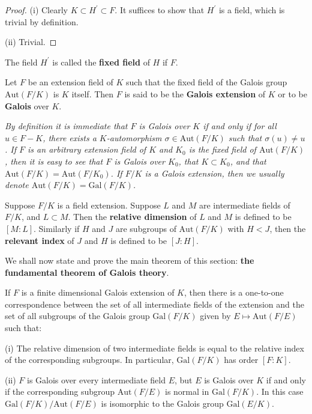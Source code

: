 \begin{proof}
(i) Clearly $K\subset H^\prime\subset F$. It suffices to show that $H^\prime$ is a field, which is trivial by definition.\par
(ii) Trivial.
\end{proof}
The field $H^\prime$ is called the \textbf{fixed field} of $H$ if $F$.
\begin{definition}
Let $F$ be an extension field of $K$ such that the fixed field of the Galois group $\mathrm{Aut}(F/K)$ is $K$ itself. Then $F$ is said to be the \textbf{Galois extension} of $K$ or to be \textbf{Galois} over $K$.
\end{definition}
\begin{note}\em
By definition it is immediate that $F$ is Galois over $K$ if and only if for all $u\in F-K$, there exists a $K$-automorphism $\sigma\in\mathrm{Aut}(F/K)$ such that $\sigma(u)\ne u$. If $F$ is an arbitrary extension field of $K$ and $K_0$ is the fixed field of $\mathrm{Aut}(F/K)$, then it is easy to see that $F$ is Galois over $K_0$, that $K\subset K_0$, and that $\mathrm{Aut}(F/K)=\mathrm{Aut}(F/K_0)$. If $F/K$ is a Galois extension, then we usually denote $\mathrm{Aut}(F/K)=\mathrm{Gal}(F/K)$.
\end{note}
Suppose $F/K$ is a field extension. Suppose $L$ and $M$ are intermediate fields of $F/K$, and $L\subset M$. Then the \textbf{relative dimension} of $L$ and $M$ is defined to be $[M:L]$. Similarly if $H$ and $J$ are subgroups of $\mathrm{Aut}(F/K)$ with $H<J$, then the \textbf{relevant index} of $J$ and $H$ is defined to be $[J:H]$.\par
We shall now state and prove the main theorem of this section: \textbf{the fundamental theorem of Galois theory}.
\begin{theorem}
If $F$ is a finite dimensional Galois extension of $K$, then there is a one-to-one correspondence between the set of all intermediate fields of the extension and the set of all subgroups of the Galois group $\mathrm{Gal}(F/K)$ given by $E\mapsto\mathrm{Aut}(F/E)$ such that:\par
(i) The relative dimension of two intermediate fields is equal to the relative index of the corresponding subgroups. In particular, $\mathrm{Gal}(F/K)$ has order $[F:K]$.\par
(ii) $F$ is Galois over every intermediate field $E$, but $E$ is Galois over $K$ if and only if the corresponding subgroup $\mathrm{Aut}(F/E)$ is normal in $\mathrm{Gal}(F/K)$. In this case $\mathrm{Gal}(F/K)/\mathrm{Aut}(F/E)$ is isomorphic to the Galois group $\mathrm{Gal}(E/K)$.
\end{theorem}
